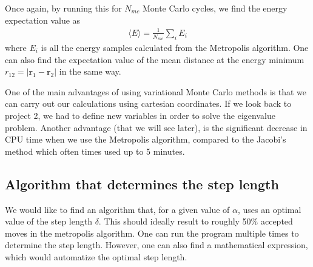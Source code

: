\documentclass[12pt]{article}
\begin{document}
Once again, by running this for $N_{mc}$ Monte Carlo cycles, we find the energy expectation value as
\begin{align*}
\langle E \rangle = \displaystyle \frac{1}{N_{mc}}\sum_i E_i
\end{align*}
where $E_i$ is all the energy samples calculated from the Metropolis algorithm. One can also find the expectation value of the mean distance at the energy minimum $r_{12} = |\mathbf{r}_1 - \mathbf{r}_2|$ in the same way.

One of the main advantages of using variational Monte Carlo methods is that we can carry out our calculations using cartesian coordinates. If we look back to project 2, we had to define new variables in order to solve the eigenvalue problem. Another advantage (that we will see later), is the significant decrease in CPU time when we use the Metropolis algorithm, compared to the Jacobi's method which often times used up to 5 minutes.
 
\subsection{Algorithm that determines the step length}
We would like to find an algorithm that, for a given value of $\alpha$, uses an optimal value of the step length $\delta$. This should ideally result to roughly 50\% accepted moves in the metropolis algorithm. One can run the program multiple times to determine the step length. However, one can also find a mathematical expression, which would automatize the optimal step length.
\end{document}
